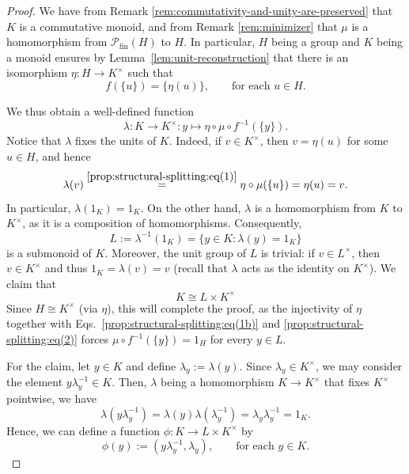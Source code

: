 \documentclass[11pt,reqno]{amsart}
\theoremstyle{definition}
\theoremstyle{remark}
\theoremstyle{theoremdd}
\newcommand{\fin}{\mathrm{fin}}
\renewcommand{\,}{\kern 0.1em}
\begin{document}
\begin{proof}
We have from Remark \ref{rem:commutativity-and-unity-are-preserved} that $K$ is a commutative monoid, and from Remark \ref{rem:minimizer} that $\mu$ is a homomorphism from $\mathcal P_\fin(H)$ to $H$. In particular, $H$ being a group and $K$ being 
a monoid ensures by Lemma~\ref{lem:unit-reconstruction} that there is an isomorphism $\eta \colon H \to K^\times$ such that 
%
\begin{equation}
\label{prop:structural-splitting:eq(1)}
f(\{u\}) = \{\eta(u)\},
\qquad\text{for each }
u \in H.
\end{equation}

We thus obtain a well-defined function
\begin{equation}
\label{prop:structural-splitting:eq(1b)}
\lambda \colon K \to K^\times \colon y \mapsto \eta \circ \mu\circ f^{-1}(\{y\}).
\end{equation}
Notice that $\lambda$ fixes the units of $K$. Indeed, if $v \in K^\times$, then $v = \eta(u)$ for some $u \in H$, and hence
\[
\lambda(v) \stackrel{\eqref{prop:structural-splitting:eq(1)}}{=} \eta \circ \mu(\{u\}) = \eta(u) = v.
\]
In particular, $\lambda(1_K) = 1_K$. On the other hand, $\lambda$ is a 
homomorphism from $K$ to $K^\times$, as it is a composition of homomorphisms. 
Consequently, 
\begin{equation}
\label{prop:structural-splitting:eq(2)}
L := \lambda^{-1}(1_K) = \{y \in K: \lambda(y) = 1_K\}
\end{equation}
is a submonoid of $K$. Moreover, the unit group of $L$ is trivial: if $v \in L^\times$, then $v \in K^\times$ and thus $1_K = \lambda(v) = v$ (recall that $\lambda$ acts as the identity on $K^\times$). We claim that 
\[
K \cong L \times K^\times
\]
Since $H \cong \allowbreak K^\times$ (via $\eta$), this will complete the proof, as the injectivity of $\eta$ together with Eqs.~\eqref{prop:structural-splitting:eq(1b)} and \eqref{prop:structural-splitting:eq(2)} forces $\mu \circ f^{-1}(\{y\}) = 1_H$ for every $y \in L$.


For the claim, let $y \in K$ and define $\lambda_y := \lambda(y)$. Since $\lambda_y \in K^\times$, we may consider the element $y\lambda_y^{-1} \in K$. Then, $\lambda$ being a homomorphism $K \to K^\times$ that fixes $K^\times$ pointwise, we have
\[
\lambda(y \lambda_y^{-1}) = \lambda(y) \lambda(\lambda_y^{-1}) = \lambda_y \lambda_y^{-1} = 1_K.
\]
Hence, we can define a function $\phi \colon K \to L \times K^\times$ by 
\[
\phi(y) := (y \lambda_y^{-1}, \lambda_y),
\qquad \text{for each } y \in K.
\]


\end{proof}
\end{document}
